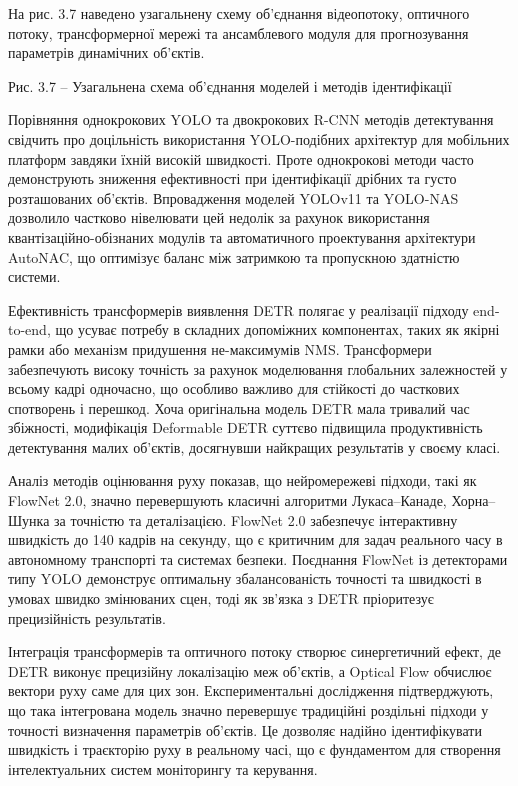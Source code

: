 \documentclass[
]{article}
\begin{document}
На рис. 3.7 наведено узагальнену схему об'єднання відеопотоку, оптичного потоку, трансформерної мережі та ансамблевого модуля для прогнозування параметрів динамічних об'єктів.

Рис. 3.7 -- Узагальнена схема об'єднання моделей і методів ідентифікації

Порівняння однокрокових YOLO та двокрокових R-CNN методів детектування свідчить про доцільність використання YOLO-подібних архітектур для мобільних платформ завдяки їхній високій швидкості. Проте однокрокові методи часто демонструють зниження ефективності при ідентифікації дрібних та густо розташованих об'єктів. Впровадження моделей YOLOv11 та YOLO-NAS дозволило частково нівелювати цей недолік за рахунок використання квантізаційно-обізнаних модулів та автоматичного проектування архітектури AutoNAC, що оптимізує баланс між затримкою та пропускною здатністю системи.

Ефективність трансформерів виявлення DETR полягає у реалізації підходу end-to-end, що усуває потребу в складних допоміжних компонентах, таких як якірні рамки або механізм придушення не-максимумів NMS. Трансформери забезпечують високу точність за рахунок моделювання глобальних залежностей у всьому кадрі одночасно, що особливо важливо для стійкості до часткових спотворень і перешкод. Хоча оригінальна модель DETR мала тривалий час збіжності, модифікація Deformable DETR суттєво підвищила продуктивність детектування малих об'єктів, досягнувши найкращих результатів у своєму класі.

Аналіз методів оцінювання руху показав, що нейромережеві підходи, такі як FlowNet 2.0, значно перевершують класичні алгоритми Лукаса--Канаде, Хорна--Шунка за точністю та деталізацією. FlowNet 2.0 забезпечує інтерактивну швидкість до 140 кадрів на секунду, що є критичним для задач реального часу в автономному транспорті та системах безпеки. Поєднання FlowNet із детекторами типу YOLO демонструє оптимальну збалансованість точності та швидкості в умовах швидко змінюваних сцен, тоді як зв'язка з DETR пріоритезує прецизійність результатів.

Інтеграція трансформерів та оптичного потоку створює синергетичний ефект, де DETR виконує прецизійну локалізацію меж об'єктів, а Optical Flow обчислює вектори руху саме для цих зон. Експериментальні дослідження підтверджують, що така інтегрована модель значно перевершує традиційні роздільні підходи у точності визначення параметрів об'єктів. Це дозволяє надійно ідентифікувати швидкість і траєкторію руху в реальному часі, що є фундаментом для створення інтелектуальних систем моніторингу та керування.
\end{document}
